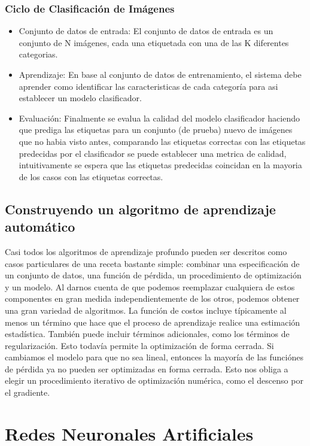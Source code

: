 \documentclass[a4paper,11pt,spanish]{book}
\begin{document}
	\subsubsection {Ciclo de Clasificación de Imágenes}
	  \begin{itemize}
	    \item Conjunto de datos de entrada: El conjunto de datos de entrada es un conjunto de N imágenes, cada una etiquetada con una de las K diferentes categorias.
	    \item Aprendizaje: En base al conjunto de datos de entrenamiento, el sistema debe aprender como identificar las caracteristicas de cada categoría para asi establecer un modelo clasificador.
	    \item Evaluación: Finalmente se evalua la calidad del modelo clasificador haciendo que prediga las etiquetas para un conjunto (de prueba) nuevo de imágenes que no habia visto antes, comparando las
	    etiquetas correctas con las etiquetas predecidas por el clasificador se puede establecer una metrica de calidad, intuitivamente se espera que las etiquetas predecidas coincidan en la mayoria
	    de los casos con las etiquetas correctas.
	  \end{itemize}
\fi


    \subsection{Construyendo un algoritmo de aprendizaje automático}
      Casi todos los algoritmos de aprendizaje profundo pueden ser descritos como casos particulares de una receta bastante simple:
      combinar una especificación de un conjunto de datos, una función de pérdida, un procedimiento de optimización y un modelo.
      Al darnos cuenta de que podemos reemplazar cualquiera de estos componentes en gran medida independientemente de los otros, podemos obtener una gran variedad de algoritmos.
      La función de costos incluye típicamente al menos un término que hace que el proceso de aprendizaje realice una estimación estadística. También puede incluir términos adicionales,
      como los términos de regularización. Esto todavía permite la optimización de forma cerrada.
      Si cambiamos el modelo para que no sea lineal, entonces la mayoría de las funciónes de pérdida ya no pueden ser optimizadas en forma cerrada.
      Esto nos obliga a elegir un procedimiento iterativo de optimización numérica, como el descenso por el gradiente.

    \section{Redes Neuronales Artificiales}
\end{document}

